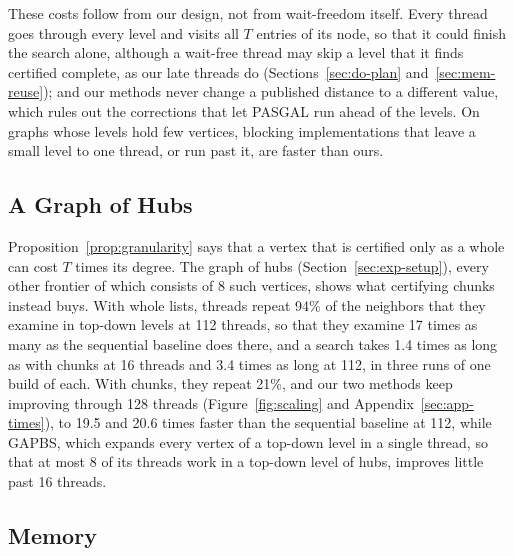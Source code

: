 These costs follow from our design, not from wait-freedom itself. Every thread goes through every level and visits all $T$ entries of its node, so that it could finish the search alone, although a wait-free thread may skip a level that it finds certified complete, as our late threads do (Sections~\ref{sec:do-plan} and~\ref{sec:mem-reuse}); and our methods never change a published distance to a different value, which rules out the corrections that let PASGAL run ahead of the levels. On graphs whose levels hold few vertices, blocking implementations that leave a small level to one thread, or run past it, are faster than ours.

\subsection{A Graph of Hubs}
\label{sec:exp-hubs}

Proposition~\ref{prop:granularity} says that a vertex that is certified only as a whole can cost $T$ times its degree. The graph of hubs (Section~\ref{sec:exp-setup}), every other frontier of which consists of 8 such vertices, shows what certifying chunks instead buys. With whole lists, threads repeat 94\% of the neighbors that they examine in top-down levels at 112 threads, so that they examine 17 times as many as the sequential baseline does there, and a search takes 1.4 times as long as with chunks at 16 threads and 3.4 times as long at 112, in three runs of one build of each. With chunks, they repeat 21\%, and our two methods keep improving through 128 threads (Figure~\ref{fig:scaling} and Appendix~\ref{sec:app-times}), to 19.5 and 20.6 times faster than the sequential baseline at 112, while GAPBS, which expands every vertex of a top-down level in a single thread, so that at most 8 of its threads work in a top-down level of hubs, improves little past 16 threads.

\subsection{Memory}
\label{sec:exp-memory}

